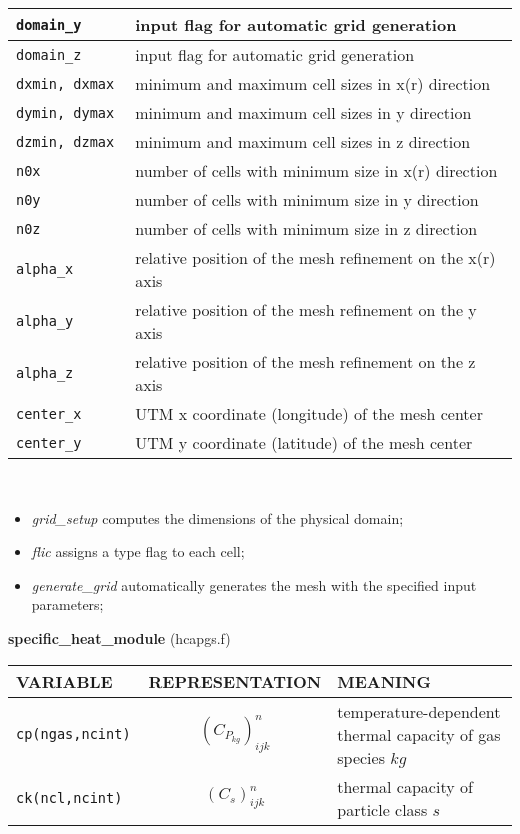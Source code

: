 \begin{tabular}{|p{6cm}|p{6cm}|}
\tt domain\_y    & input flag for automatic grid generation\\ \hline
\tt domain\_z    & input flag for automatic grid generation\\ \hline
\tt dxmin, dxmax & minimum and maximum cell sizes in x(r) direction \\ \hline
\tt dymin, dymax & minimum and maximum cell sizes in y direction  \\ \hline
\tt dzmin, dzmax & minimum and maximum cell sizes in z direction  \\ \hline
\tt n0x    & number of cells with minimum size in x(r) direction \\ \hline
\tt n0y    & number of cells with minimum size in y direction \\ \hline
\tt n0z    & number of cells with minimum size in z direction\\ \hline
\tt alpha\_x    & relative position of the mesh refinement on the x(r) axis \\ \hline
\tt alpha\_y    & relative position of the mesh refinement on the y axis\\ \hline
\tt alpha\_z    & relative position of the mesh refinement on the z axis \\ \hline
\tt center\_x    & UTM x coordinate (longitude) of the mesh center \\ \hline
\tt center\_y    & UTM y coordinate (latitude) of the mesh center \\ \hline
\end{tabular}\\[5mm]
\begin{itemize}
\item{\em grid\_setup} computes the dimensions of the physical domain;
\item{\em flic} assigns a type flag to each cell;
\item{\em generate\_grid} automatically generates the mesh with the specified input parameters;
\end{itemize}
%
%
{\large{\bf specific\_heat\_module}} (hcapgs.f)\\[5mm]
\begin{tabular}{|p{6cm}|c|p{6cm}|}\hline
VARIABLE & REPRESENTATION & MEANING\\\hline
\tt cp(ngas,ncint) & $(C_{P_{kg}})^n_{ijk}$ & temperature-dependent thermal capacity of gas species $kg$\\\hline
\tt ck(ncl,ncint) & $(C_s)^n_{ijk}$ & thermal capacity of particle class $s$\\\hline
\end{tabular}\\
